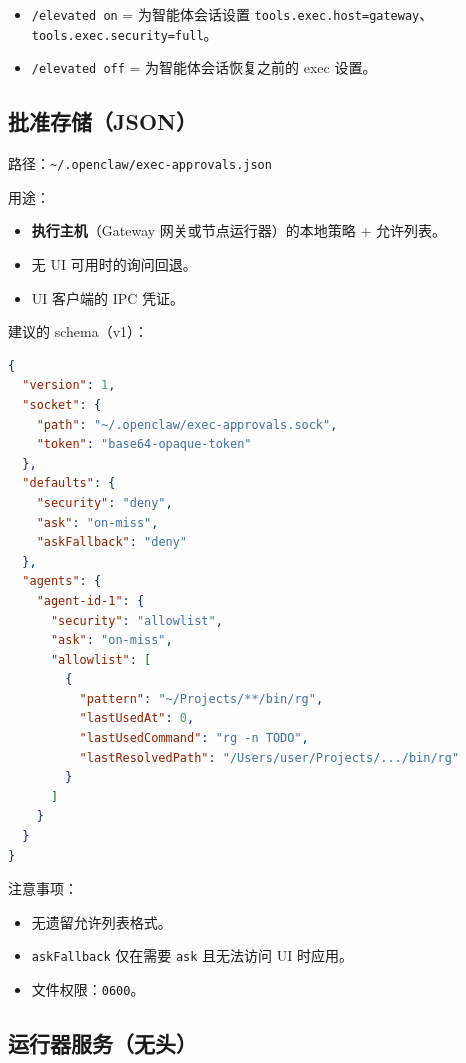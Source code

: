 \begin{itemize}
  \item \texttt{/elevated on} = 为智能体会话设置 \texttt{tools.exec.host=gateway}、\texttt{tools.exec.security=full}。
  \item \texttt{/elevated off} = 为智能体会话恢复之前的 exec 设置。
\end{itemize}


\subsection{批准存储（JSON）}


路径：\texttt{\textasciitilde{}/.openclaw/exec-approvals.json}

用途：

\begin{itemize}
  \item \textbf{执行主机}（Gateway 网关或节点运行器）的本地策略 + 允许列表。
  \item 无 UI 可用时的询问回退。
  \item UI 客户端的 IPC 凭证。
\end{itemize}


建议的 schema（v1）：

\begin{lstlisting}[language=json]
{
  "version": 1,
  "socket": {
    "path": "~/.openclaw/exec-approvals.sock",
    "token": "base64-opaque-token"
  },
  "defaults": {
    "security": "deny",
    "ask": "on-miss",
    "askFallback": "deny"
  },
  "agents": {
    "agent-id-1": {
      "security": "allowlist",
      "ask": "on-miss",
      "allowlist": [
        {
          "pattern": "~/Projects/**/bin/rg",
          "lastUsedAt": 0,
          "lastUsedCommand": "rg -n TODO",
          "lastResolvedPath": "/Users/user/Projects/.../bin/rg"
        }
      ]
    }
  }
}
\end{lstlisting}


注意事项：

\begin{itemize}
  \item 无遗留允许列表格式。
  \item \texttt{askFallback} 仅在需要 \texttt{ask} 且无法访问 UI 时应用。
  \item 文件权限：\texttt{0600}。
\end{itemize}


\subsection{运行器服务（无头）}


